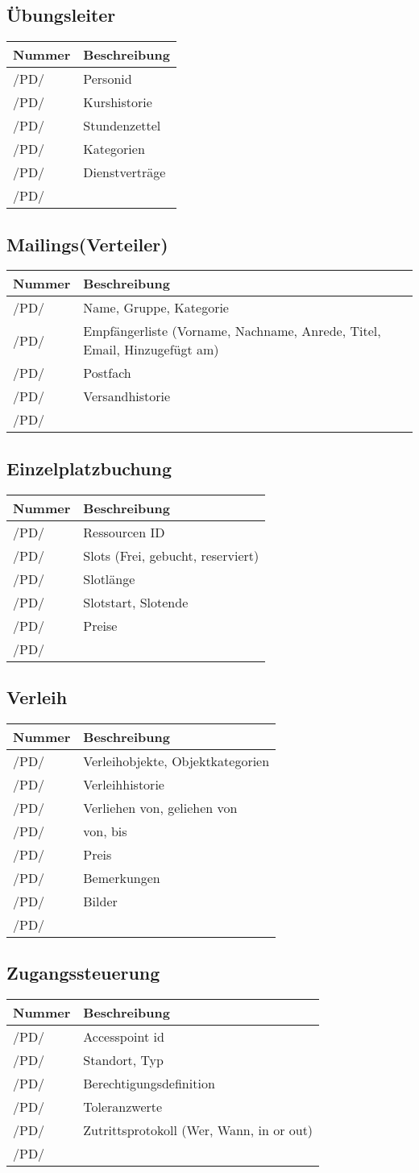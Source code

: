 \documentclass[a4paper,11pt]{article}
\newcommand\addrow[2]{#1 &#2\\ }
\newcommand\addheading[2]{#1 &#2\\ \hline}
\newcommand\tabularhead{\begin{tabular}{lp{13cm}}
\hline
}
\newenvironment{usecase}{\tabularhead}
{\hline\end{tabular}}
\begin{document}
\subsection{Übungsleiter}
\begin{usecase}
  \addheading{Nummer}{Beschreibung} 
  \addrow{/PD/}{Personid}
  \addrow{/PD/}{Kurshistorie}
  \addrow{/PD/}{Stundenzettel}
  \addrow{/PD/}{Kategorien}
  \addrow{/PD/}{Dienstverträge}
  \addrow{/PD/}{}
\end{usecase}

\subsection{Mailings(Verteiler)}
\begin{usecase}
  \addheading{Nummer}{Beschreibung} 
  \addrow{/PD/}{Name, Gruppe, Kategorie}
  \addrow{/PD/}{Empfängerliste (Vorname, Nachname, Anrede, Titel, Email, Hinzugefügt am)}
  \addrow{/PD/}{Postfach}
  \addrow{/PD/}{Versandhistorie}
  \addrow{/PD/}{}
\end{usecase}

\subsection{Einzelplatzbuchung}
\begin{usecase}
  \addheading{Nummer}{Beschreibung} 
  \addrow{/PD/}{Ressourcen ID}
  \addrow{/PD/}{Slots (Frei, gebucht, reserviert)}
  \addrow{/PD/}{Slotlänge}
  \addrow{/PD/}{Slotstart, Slotende}
  \addrow{/PD/}{Preise}
  \addrow{/PD/}{}
\end{usecase}

\subsection{Verleih}
\begin{usecase}
  \addheading{Nummer}{Beschreibung} 
  \addrow{/PD/}{Verleihobjekte, Objektkategorien}
  \addrow{/PD/}{Verleihhistorie}
  \addrow{/PD/}{Verliehen von, geliehen von}
  \addrow{/PD/}{von, bis}
  \addrow{/PD/}{Preis}
  \addrow{/PD/}{Bemerkungen}
  \addrow{/PD/}{Bilder}
  \addrow{/PD/}{}
\end{usecase}

\subsection{Zugangssteuerung}
\begin{usecase}
  \addheading{Nummer}{Beschreibung} 
  \addrow{/PD/}{Accesspoint id}
  \addrow{/PD/}{Standort, Typ}
  \addrow{/PD/}{Berechtigungsdefinition}
  \addrow{/PD/}{Toleranzwerte}
  \addrow{/PD/}{Zutrittsprotokoll (Wer, Wann, in or out)}
  \addrow{/PD/}{}
\end{usecase}
\end{document}
